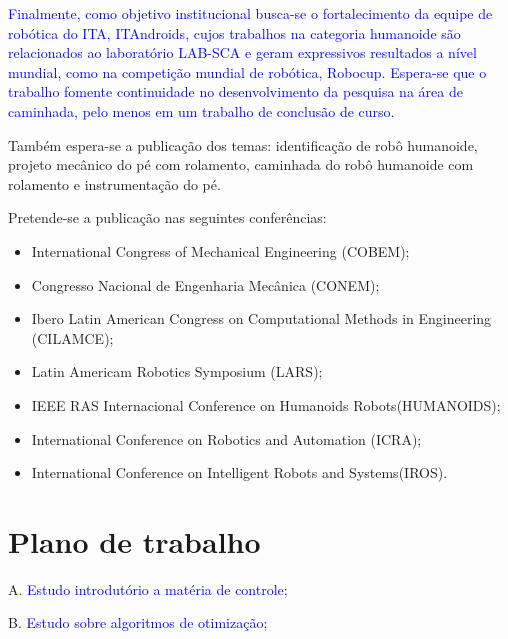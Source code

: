 \textcolor{blue}{Finalmente, como objetivo institucional busca-se o fortalecimento da equipe de robótica do ITA, ITAndroids, cujos trabalhos na categoria humanoide são relacionados ao laboratório LAB-SCA e geram expressivos resultados a nível mundial, como na competição mundial de robótica, Robocup. Espera-se que o trabalho fomente continuidade no desenvolvimento da pesquisa na área de caminhada, pelo menos em um trabalho de conclusão de curso.}



Também espera-se a publicação dos temas: identificação de robô humanoide, projeto mecânico do pé com rolamento, caminhada do robô humanoide com rolamento e instrumentação do pé. 

Pretende-se a publicação nas seguintes conferências:
\begin{itemize}
   \item International Congress of Mechanical Engineering (COBEM);
   \item Congresso Nacional de Engenharia Mecânica (CONEM);

\item Ibero Latin American Congress on Computational Methods in Engineering (CILAMCE);

\item Latin Americam Robotics Symposium (LARS);

\item IEEE RAS Internacional Conference on Humanoids Robots(HUMANOIDS);

\item International Conference on Robotics and Automation (ICRA);

\item International Conference on Intelligent Robots and Systems(IROS).
 \end{itemize}


\section{Plano de trabalho}

A.	\textcolor{blue}{Estudo introdutório a matéria de controle;}

B.	\textcolor{blue}{Estudo sobre algoritmos de otimização;}

